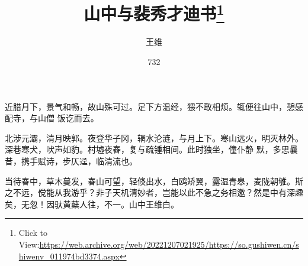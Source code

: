 \documentclass{article}
\title{山中与裴秀才迪书\footnote{Click to View:\url{https://web.archive.org/web/20221207021925/https://so.gushiwen.cn/shiwenv_011974bd3374.aspx}}}
\author{王维}
\date{732}
\begin{document}

\maketitle


\Large

﻿近腊月下，景气和畅，故山殊可过。足下方温经，猥不敢相烦。辄便往山中，憩感配寺，与山僧
饭讫而去。 

北涉元灞，清月映郭。夜登华子冈，辋水沦涟，与月上下。寒山远火，明灭林外。深巷寒犬，吠声如豹。村墟夜舂，复与疏锺相间。此时独坐，僮仆静
默，多思曩昔，携手赋诗，步仄迳，临清流也。 

当待春中，草木蔓发，春山可望，轻倏出水，白鸥矫翼，露湿青皋，麦陇朝雊。斯之不远，傥能从我游乎？非子天机清妙者，岂能以此不急之务相邀？然是中有深趣矣，无忽！因驮黄蘖人往，不一。山中王维白。
\end{document}
